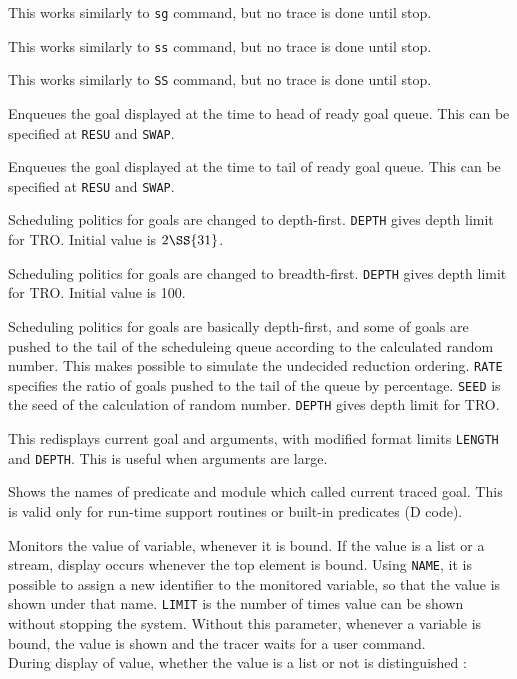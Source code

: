 \begin{itemize}
This works similarly to \verb|sg| command, but no trace is done until stop.

This works similarly to \verb|ss| command, but no trace is done until stop.

This works similarly to \verb|SS| command, but no trace is done until stop.

Enqueues the goal displayed at the time to head of ready goal queue.
This can be specified at \verb|RESU| and \verb|SWAP|.

Enqueues the goal displayed at the time to tail of ready goal queue.
This can be specified at \verb|RESU| and \verb|SWAP|.

Scheduling politics for goals are changed to depth-first.
\verb|DEPTH| gives depth limit for TRO. Initial value is $2\SS{31}$.

Scheduling politics for goals are changed to breadth-first.
\verb|DEPTH| gives depth limit for TRO. Initial value is 100.

Scheduling politics for goals are basically depth-first,
and some of goals are pushed to the tail of the scheduleing queue
according to the calculated random number.
This makes possible to simulate the undecided reduction ordering.
\verb|RATE| specifies the ratio of goals pushed to the tail of the queue
by percentage. \verb|SEED| is the seed of the calculation of random number.
\verb|DEPTH| gives depth limit for TRO.

This redisplays current goal and arguments, with modified format limits
\verb|LENGTH| and \verb|DEPTH|. This is useful when arguments are large.

Shows the names of predicate and module which called current traced goal. This
is valid only for run-time support routines or built-in predicates (D code).

Monitors the value of variable, whenever it is bound. If the value is a
list or a stream, display occurs whenever the top element is bound. Using
\verb|NAME|, it is possible to assign a new identifier to the monitored
variable, so that the value is shown under that name. \verb|LIMIT| is the
number of times value can be shown without stopping the system. Without this
parameter, whenever a variable is bound, the value is shown and the tracer
waits for a user command.\\
During display of value, whether the value is a list or
not is distinguished :\vspace{1ex}


\end{itemize}
